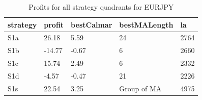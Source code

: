 \documentclass{tewiart}
\begin{document}
\newpage
\begin{table}[!t]
\caption{Profits for all strategy quadrants for EURJPY} 
 \begin{center} 
 \begin{tabular}{|l|l|l|l|l|} 
 \hline \textbf{strategy} & \textbf{profit} & \textbf{bestCalmar} & \textbf{bestMALength} & \textbf{la} \\ \hline  
S1a & 26.18 & 5.59 & 24 & 2764\\ \hline 
S1b & -14.77 & -0.67 & 6 & 2660\\ \hline 
S1c & 15.74 & 2.49 & 6 & 2332\\ \hline 
S1d & -4.57 & -0.47 & 21 & 2226\\ \hline 
S1s & 22.54 & 3.25 & Group of MA & 4975\\ 
\hline \end{tabular} 
 \end{center} 
 \end{table}
\FloatBarrier
\end{document}
